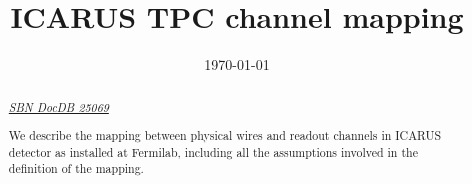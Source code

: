 \documentclass{article}
\title{ICARUS TPC channel mapping}
\date{\today}
\begin{document}

\maketitle

\begin{abstract}
\centerline{\large\emph{\href{https://sbn-docdb.fnal.gov/cgi-bin/sso/ShowDocument?docid=25068}{SBN DocDB 25069}}}

We describe the mapping between physical wires and readout channels in ICARUS detector as installed at Fermilab,
including all the assumptions involved in the definition of the mapping.
\end{abstract}

\tableofcontents

















\end{document}
